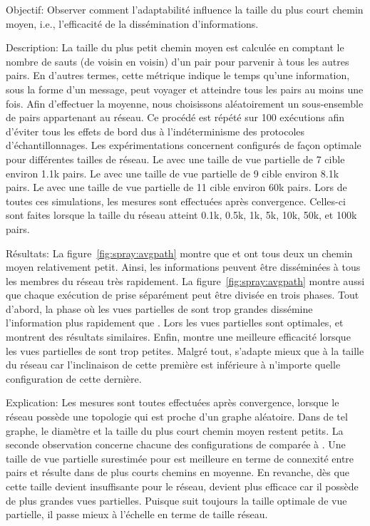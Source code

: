 \begin{asparadesc}
\item [Objectif:] Observer comment l'adaptabilité influence la taille du plus
  court chemin moyen, i.e., l'efficacité de la dissémination d'informations.
\item [Description:] La taille du plus petit chemin moyen est calculée en
  comptant le nombre de sauts (de voisin en voisin) d'un pair pour parvenir à
  tous les autres pairs. En d'autres termes, cette métrique indique le temps
  qu'une information, sous la forme d'un message, peut voyager et atteindre tous
  les pairs au moins une fois. Afin d'effectuer la moyenne, nous choisissons
  aléatoirement un sous-ensemble de pairs appartenant au réseau. Ce procédé est
  répété sur 100 exécutions afin d'éviter tous les effets de bord dus à
  l'indéterminisme des protocoles d'échantillonnages. Les expérimentations
  concernent \CYCLON configurés de façon optimale pour différentes tailles de
  réseau. Le \CYCLON avec une taille de vue partielle de 7 cible environ 1.1k
  pairs. Le \CYCLON avec une taille de vue partielle de 9 cible environ 8.1k
  pairs. Le \CYCLON avec une taille de vue partielle de 11 cible environ 60k
  pairs. Lors de toutes ces simulations, les mesures sont effectuées après
  convergence. Celles-ci sont faites lorsque la taille du réseau atteint 0.1k,
  0.5k, 1k, 5k, 10k, 50k, et 100k pairs. 
\item [Résultats:] La figure~\ref{fig:spray:avgpath} montre que \CYCLON et
  \SPRAY ont tous deux un chemin moyen relativement petit. Ainsi, les
  informations peuvent être disséminées à tous les membres du réseau très
  rapidement. La figure~\ref{fig:spray:avgpath} montre aussi que chaque
  exécution de \CYCLON prise séparément peut être divisée en trois phases.  Tout
  d'abord, la phase où les vues partielles de \CYCLON sont trop grandes
  dissémine l'information plus rapidement que \SPRAY. Lors les vues partielles
  sont optimales, \CYCLON et \SPRAY montrent des résultats similaires. Enfin,
  \SPRAY montre une meilleure efficacité lorsque les vues partielles de \CYCLON
  sont trop petites. Malgré tout, \SPRAY s'adapte mieux que \CYCLON à la taille
  du réseau car l'inclinaison de cette première est inférieure à n'importe
  quelle configuration de cette dernière.
\item [Explication:] Les mesures sont toutes effectuées après convergence,
  lorsque le réseau possède une topologie qui est proche d'un graphe aléatoire.
  Dans de tel graphe, le diamètre et la taille du plus court chemin moyen
  restent petits. La seconde observation concerne chacune des configurations de
  \CYCLON comparée à \SPRAY. Une taille de vue partielle surestimée pour \CYCLON
  est meilleure en terme de connexité entre pairs et résulte dans de plus courts
  chemins en moyenne. En revanche, dès que cette taille devient insuffisante
  pour le réseau, \SPRAY devient plus efficace car il possède de plus grandes
  vues partielles. Puisque \SPRAY suit toujours la taille optimale de vue
  partielle, il passe mieux à l'échelle en terme de taille réseau.
\end{asparadesc}

